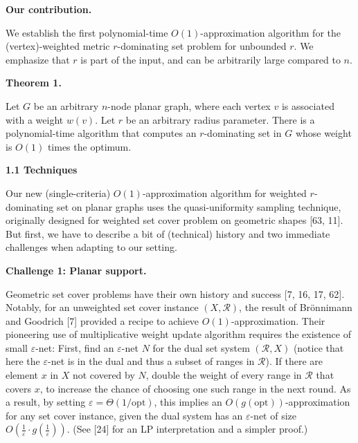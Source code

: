 \par
\par\medskip\noindent\textbf{Our contribution.}\par
We establish the first polynomial-time $O(1)$-approximation algorithm for the (vertex)-weighted metric $r$-dominating set problem for unbounded $r$. We emphasize that $r$ is part of the input, and can be arbitrarily large compared to $n$.
\par
\par
\par\medskip\noindent\textbf{Theorem 1.}\par
Let $G$ be an arbitrary $n$-node planar graph, where each vertex $v$ is associated with a weight $w(v)$. Let $r$ be an arbitrary radius parameter. There is a polynomial-time algorithm that computes an $r$-dominating set in $G$ whose weight is $O(1)$ times the optimum.
\par
\par
\par
\par\medskip\noindent\textbf{1.1 Techniques}\par
Our new (single-criteria) $O(1)$-approximation algorithm for weighted $r$-dominating set on planar graphs uses the quasi-uniformity sampling technique, originally designed for weighted set cover problem on geometric shapes [63, 11]. But first, we have to describe a bit of (technical) history and two immediate challenges when adapting to our setting.
\par
\par
\par\medskip\noindent\textbf{Challenge 1: Planar support.}\par
Geometric set cover problems have their own history and success [7, 16, 17, 62]. Notably, for an unweighted set cover instance $(X,\mathcal{R})$, the result of Brönnimann and Goodrich [7] provided a recipe to achieve $O(1)$-approximation. Their pioneering use of multiplicative weight update algorithm requires the existence of small $\varepsilon$-net: First, find an $\varepsilon$-net $N$ for the dual set system $(\mathcal{R},X)$ (notice that here the $\varepsilon$-net is in the dual and thus a subset of ranges in $\mathcal{R}$). If there are element $x$ in $X$ not covered by $N$, double the weight of every range in $\mathcal{R}$ that covers $x$, to increase the chance of choosing one such range in the next round. As a result, by setting $\varepsilon=\Theta(1/\mathrm{opt})$, this implies an $O(g(\mathrm{opt}))$-approximation for any set cover instance, given the dual system has an $\varepsilon$-net of size $O(\frac{1}{\varepsilon}\cdot g(\frac{1}{\varepsilon}))$. (See [24] for an LP interpretation and a simpler proof.)

